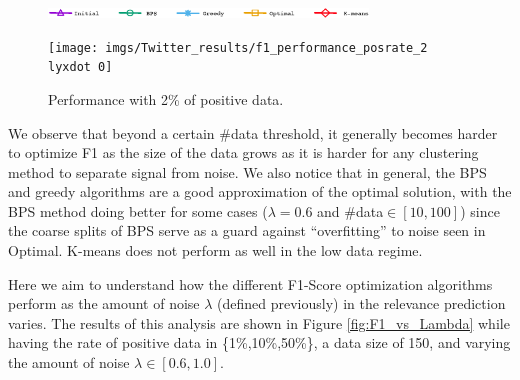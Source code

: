 



\begin{figure}[H]
\begin{centering}
\includegraphics[width=8.5cm]{imgs/legend1}
\par\end{centering}
\begin{centering}
{\texttt{[image: imgs/Twitter\_results/f1\_performance\_posrate\_2\\lyxdot 0]}}
\par\end{centering}
\caption{Performance with 2\% of positive data.}
\label{fig:F1_vs_Data_Twitter}
\end{figure}




We observe that beyond a certain \#data threshold, it generally becomes harder to optimize F1 as the size of the data grows as it is harder for any clustering method to separate signal from noise.
We also notice that in general, the BPS and greedy algorithms are a good approximation of the optimal solution, with the BPS method doing better for some cases ($\lambda=0.6$ and \#data$\in [10,100]$) since the coarse splits of BPS serve as a guard against ``overfitting'' to noise seen in Optimal.  K-means does not perform as well in the low data regime.


  Here we aim to understand how the different F1-Score optimization algorithms perform as the amount of noise $\lambda$ (defined previously) in the relevance prediction varies.
The results of this analysis are shown in Figure \ref{fig:F1_vs_Lambda} while having the rate of positive data in \{1\%,10\%,50\%\}, a data size of 150, and varying the amount of noise $\lambda \in [0.6,1.0]$.

